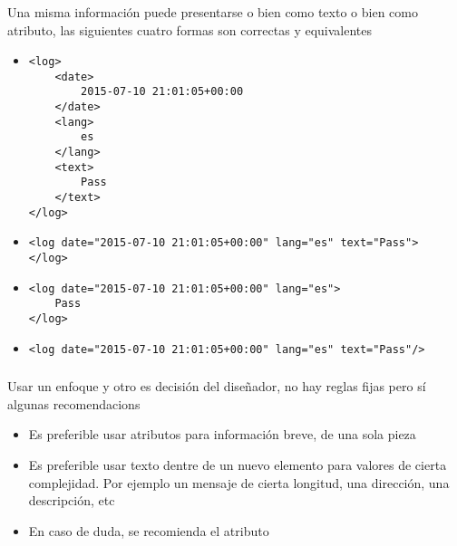 \documentclass[ucs]{beamer}
\begin{document}
\begin{frame}[fragile]
\frametitle{}
Una misma información puede presentarse o bien como texto o bien como
atributo, las siguientes cuatro formas son correctas y equivalentes
\begin{itemize}
\item
  \begin{tiny}
  \begin{verbatim}
<log>
    <date>
        2015-07-10 21:01:05+00:00
    </date>
    <lang>
        es
    </lang>
    <text>
        Pass
    </text>
</log>
  \end{verbatim}
  \end{tiny}
\item
  \begin{tiny}
  \begin{verbatim}
<log date="2015-07-10 21:01:05+00:00" lang="es" text="Pass">
</log>
  \end{verbatim}
  \end{tiny}

\item
  \begin{tiny}
  \begin{verbatim}
<log date="2015-07-10 21:01:05+00:00" lang="es">
    Pass
</log>
  \end{verbatim}
  \end{tiny}


\item
  \begin{tiny}
  \begin{verbatim}
<log date="2015-07-10 21:01:05+00:00" lang="es" text="Pass"/>
  \end{verbatim}
  \end{tiny}
\end{itemize}

\end{frame}


\begin{frame}[fragile]
\frametitle{}
Usar un enfoque y otro es decisión del diseñador, no hay reglas fijas
pero sí algunas recomendacions
\begin{itemize}
\item
Es preferible usar atributos para información breve, de una sola pieza
\item
Es preferible usar texto dentre de un nuevo elemento para valores 
de cierta complejidad. Por ejemplo un mensaje de cierta longitud,
una dirección, una descripción, etc
\item
En caso de duda, se recomienda el atributo
\end{itemize}

\end{frame}
\end{document}
